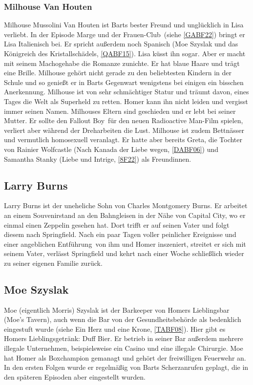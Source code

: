 {\subsubsection{Milhouse Van Houten}\label{MilhouseVanHouten}
Milhouse Mussolini Van Houten ist Barts bester Freund und unglücklich in Lisa verliebt. In der Episode \glqq Marge und der Frauen-Club\grqq\ (siehe \ref{GABF22}) bringt er Lisa Italienisch bei. Er spricht außerdem noch Spanisch (\glqq Moe Szyslak und das Königreich des Kristallschädels\grqq, \ref{QABF15}). Lisa küsst ihn sogar. Aber er macht mit seinem Machogehabe die Romanze zunichte. Er hat blaue Haare und trägt eine Brille. Milhouse gehört nicht gerade zu den beliebtesten Kindern in der Schule und so genießt er in Barts Gegenwart wenigstens bei einigen ein bisschen Anerkennung. Milhouse ist von sehr schmächtiger Statur und träumt davon, eines Tages die Welt als Superheld zu retten. Homer kann ihn nicht leiden und vergisst immer seinen Namen. Milhouses Eltern sind geschieden und er lebt bei seiner Mutter. Er sollte den \glqq Fallout Boy\grqq\ für den neuen \glqq Radioactive Man\grqq -Film spielen, verliert aber während der Dreharbeiten die Lust. Milhouse ist zudem Bettnässer und vermutlich homosexuell veranlagt. Er hatte aber bereits Greta, die Tochter von Rainier Wolfcastle (\glqq Nach Kanada der Liebe wegen\grqq, \ref{DABF06}) und Samantha Stanky (\glqq Liebe und Intrige\grqq, \ref{8F22}) als Freundinnen. 


\subsection{Larry Burns}
Larry Burns ist der uneheliche Sohn von Charles Montgomery Burns. Er arbeitet an einem Souvenirstand an den Bahngleisen in der Nähe von Capital City, wo er einmal einen Zeppelin gesehen hat. Dort trifft er auf seinen Vater und folgt diesem nach Springfield. Nach ein paar Tagen voller peinlicher Ereignisse und einer angeblichen \glqq Entführung\grqq\ von ihm und Homer inszeniert, streitet er sich mit seinem Vater, verlässt Springfield und kehrt nach einer Woche schließlich wieder zu seiner eigenen Familie zurück.

 
\subsection{Moe Szyslak}\label{MoeSzyslak}
Moe (eigentlich Morris) Szyslak ist der Barkeeper von Homers Lieblingsbar (Moe's Tavern), auch wenn die Bar von der Gesundheitsbehörde als bedenklich eingestuft wurde (siehe \glqq Ein Herz und eine Krone\grqq , \ref{TABF08}). Hier gibt es Homers Lieblingsgetränk: Duff Bier. Er betrieb in seiner Bar außerdem mehrere illegale Unternehmen, beispielsweise ein Casino und eine illegale Chirurgie. Moe hat Homer als Boxchampion gemanagt und gehört der freiwilligen Feuerwehr an. In den ersten Folgen wurde er regelmäßig von Barts Scherzanrufen geplagt, die in den späteren Episoden aber eingestellt wurden.

}
